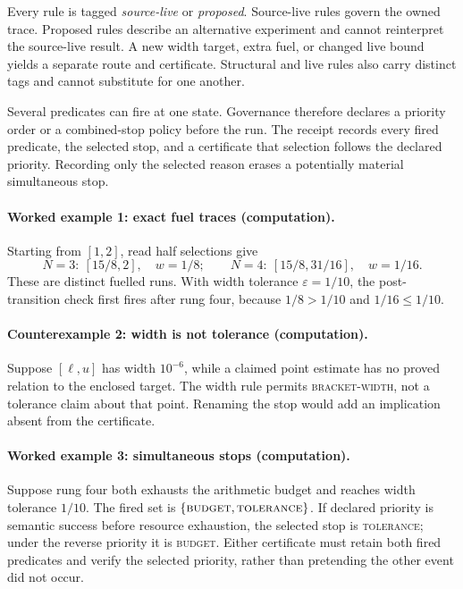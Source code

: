 Every rule is tagged \emph{source-live} or \emph{proposed}.  Source-live rules govern the owned trace.  Proposed rules
describe an alternative experiment and cannot reinterpret the source-live result.  A new width target, extra fuel, or
changed live bound yields a separate route and certificate.  Structural and live rules also carry distinct tags and
cannot substitute for one another.

Several predicates can fire at one state.  Governance therefore declares a priority order or a combined-stop policy
before the run.  The receipt records every fired predicate, the selected stop, and a certificate that selection follows the
declared priority.  Recording only the selected reason erases a potentially material simultaneous stop.

\paragraph{Worked example 1: exact fuel traces (computation).}
Starting from \([1,2]\), read half selections give
\[
N=3:\ [15/8,2],\quad w=1/8;\qquad
N=4:\ [15/8,31/16],\quad w=1/16.
\]
These are distinct fuelled runs.  With width tolerance \(\varepsilon=1/10\), the post-transition check first fires
after rung four, because \(1/8>1/10\) and \(1/16\leq1/10\).

\paragraph{Counterexample 2: width is not tolerance (computation).}
Suppose \([\ell,u]\) has width \(10^{-6}\), while a claimed point estimate has no proved relation to the enclosed
target.  The width rule permits \textsc{bracket-width}, not a tolerance claim about that point.  Renaming the stop
would add an implication absent from the certificate.

\paragraph{Worked example 3: simultaneous stops (computation).}
Suppose rung four both exhausts the arithmetic budget and reaches width tolerance \(1/10\).  The fired set is
\(\{\textsc{budget},\textsc{tolerance}\}\).  If declared priority is semantic success before resource exhaustion, the
selected stop is \textsc{tolerance}; under the reverse priority it is \textsc{budget}.  Either certificate must retain
both fired predicates and verify the selected priority, rather than pretending the other event did not occur.

